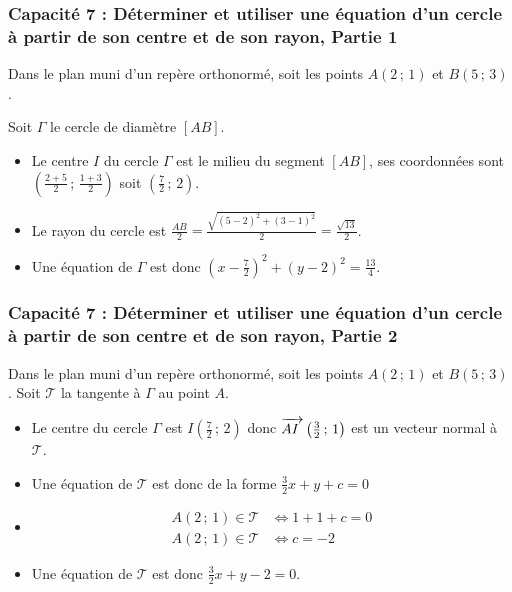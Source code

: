 \documentclass[11pt, hyperref={urlcolor=red,%
            linkcolor=blue, %
            colorlinks=true}]{beamer}
\newcommand{\Coord}[2]{\left(#1\, ;\, #2\right)}
\newcommand{\vect}[1]{\mathchoice%
{\overrightarrow{\displaystyle\mathstrut#1\,\,}}%
{\overrightarrow{\textstyle\mathstrut#1\,\,}}%
{\overrightarrow{\scriptstyle\mathstrut#1\,\,}}%
{\overrightarrow{\scriptscriptstyle\mathstrut#1\,\,}}}
\begin{document}
\begin{frame}
\label{capapcite7}
\frametitle{Capacité 7 : Déterminer et utiliser une équation d'un cercle à partir de son centre et de son rayon, Partie 1}

Dans le plan muni d'un repère orthonormé, soit les points $A\Coord{2}{1}$ et $B\Coord{5}{3}$.

Soit $\Gamma$ le cercle de diamètre $[AB]$.

\begin{itemize}
\pause \item Le centre $I$ du cercle  $\Gamma$ est le milieu du segment $[AB]$, ses coordonnées sont $\Coord{\frac{2+5}{2}}{\frac{1+3}{2}}$ soit $\Coord{\frac{7}{2}}{2}$.
\pause \item Le rayon du cercle est $\frac{AB}{2}=\frac{\sqrt{(5-2)^{2}+(3-1)^{2}}}{2}=\frac{\sqrt{13}}{2}$.
\pause \item Une équation de $\Gamma$ est donc $(x-\frac{7}{2})^{2}+(y-2)^{2}=\frac{13}{4}$.
\end{itemize}
\end{frame}



\begin{frame}

\frametitle{Capacité 7 : Déterminer et utiliser une équation d'un cercle à partir de son centre et de son rayon, Partie 2}

Dans le plan muni d'un repère orthonormé, soit les points $A\Coord{2}{1}$ et $B\Coord{5}{3}$.  Soit $\mathcal{T}$ la tangente à $\Gamma$ au point $A$.

\begin{itemize}
\pause \item Le centre du cercle  $\Gamma$ est  $I\Coord{\frac{7}{2}}{2}$ donc $\vect{AI}\Coord{\frac{3}{2}}{1}$ est un vecteur normal à $\mathcal{T}$.
\pause \item Une équation de $\mathcal{T}$ est donc de la forme $\frac{3}{2}x+y+c=0$
\pause \item \begin{align*}
A\Coord{2}{1} \in \mathcal{T} &\Leftrightarrow 1+1+c=0 \\
A\Coord{2}{1} \in \mathcal{T} &\Leftrightarrow c=-2 
\end{align*}
\pause \item Une équation de $ \mathcal{T}$  est donc $\frac{3}{2}x+y-2=0$.
\end{itemize}
\end{frame}
\end{document}
